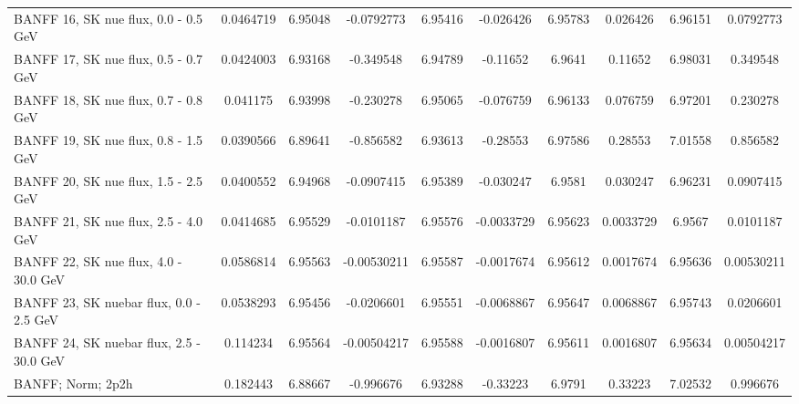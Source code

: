 \begin{tabular}{| l | S | S  S | S  S | S  S | S  S | }
                                            BANFF 16, SK nue flux, 0.0 - 0.5 GeV &       0.0464719 &         6.95048 &      -0.0792773 &         6.95416 &       -0.026426 &         6.95783 &        0.026426 &         6.96151 &       0.0792773 \\ 
                                            BANFF 17, SK nue flux, 0.5 - 0.7 GeV &       0.0424003 &         6.93168 &       -0.349548 &         6.94789 &        -0.11652 &          6.9641 &         0.11652 &         6.98031 &        0.349548 \\ 
                                            BANFF 18, SK nue flux, 0.7 - 0.8 GeV &        0.041175 &         6.93998 &       -0.230278 &         6.95065 &       -0.076759 &         6.96133 &        0.076759 &         6.97201 &        0.230278 \\ 
                                            BANFF 19, SK nue flux, 0.8 - 1.5 GeV &       0.0390566 &         6.89641 &       -0.856582 &         6.93613 &        -0.28553 &         6.97586 &         0.28553 &         7.01558 &        0.856582 \\ 
                                            BANFF 20, SK nue flux, 1.5 - 2.5 GeV &       0.0400552 &         6.94968 &      -0.0907415 &         6.95389 &       -0.030247 &          6.9581 &        0.030247 &         6.96231 &       0.0907415 \\ 
                                            BANFF 21, SK nue flux, 2.5 - 4.0 GeV &       0.0414685 &         6.95529 &      -0.0101187 &         6.95576 &      -0.0033729 &         6.95623 &       0.0033729 &          6.9567 &       0.0101187 \\ 
                                           BANFF 22, SK nue flux, 4.0 - 30.0 GeV &       0.0586814 &         6.95563 &     -0.00530211 &         6.95587 &      -0.0017674 &         6.95612 &       0.0017674 &         6.95636 &      0.00530211 \\ 
                                         BANFF 23, SK nuebar flux, 0.0 - 2.5 GeV &       0.0538293 &         6.95456 &      -0.0206601 &         6.95551 &      -0.0068867 &         6.95647 &       0.0068867 &         6.95743 &       0.0206601 \\ 
                                        BANFF 24, SK nuebar flux, 2.5 - 30.0 GeV &        0.114234 &         6.95564 &     -0.00504217 &         6.95588 &      -0.0016807 &         6.95611 &       0.0016807 &         6.95634 &      0.00504217 \\ 
                                                               BANFF; Norm; 2p2h &        0.182443 &         6.88667 &       -0.996676 &         6.93288 &        -0.33223 &          6.9791 &         0.33223 &         7.02532 &        0.996676 \\ 

\end{tabular}
